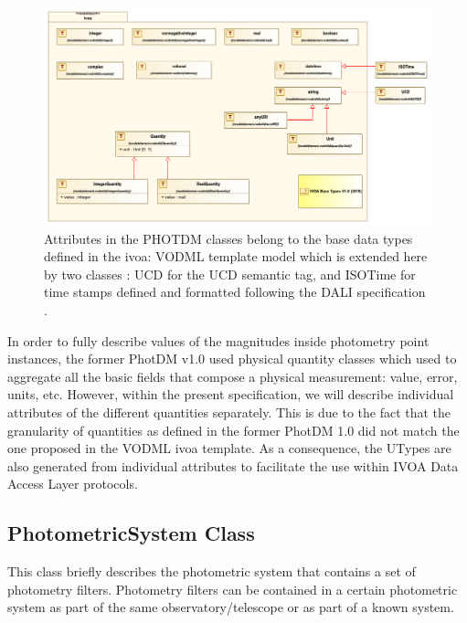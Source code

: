\documentclass[11pt,a4paper]{ivoa}
\begin{document}
\begin{figure}[H]
\includegraphics[angle=0,width=5.98in ]{./schema/BaseDataTypesDiagram_PR_20220520.png} 
\caption{Attributes in the PHOTDM classes belong to the base data types defined in the ivoa: VODML template model which is extended here by two classes : UCD for the UCD semantic tag, and ISOTime for time stamps defined and formatted following the DALI specification \citep{2017ivoa.spec.0517D} .} 
\end{figure}





\newpage


\newpage
In order to fully describe values of the magnitudes inside photometry point
instances, the former PhotDM v1.0 used  physical quantity classes which used to 
aggregate all the basic fields that compose a physical measurement: value, 
error, units, etc. However, within the present specification, we will describe
individual attributes of the different quantities separately. 
This is due to the fact that the granularity of quantities as defined in the former PhotDM 1.0 
did not match the one proposed in the VODML ivoa template. As a consequence, the UTypes are also
generated from individual attributes to facilitate the use within IVOA Data Access Layer protocols.

\par

\subsection{PhotometricSystem Class}
This class briefly describes the photometric system that contains a set of
photometry filters. Photometry filters can be contained in a certain
photometric system as part of the same observatory/telescope or as part
of a known system.
\par
\end{document}
